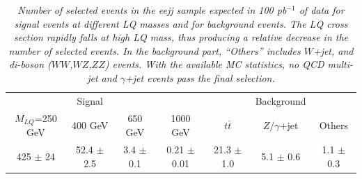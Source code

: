 


\begin{table}[htbp]
\begin{center}
\begin{tabular}{|cccc||ccc|}
\hline
                 &   Signal&         &          & & Background & \\
$M_{LQ}$=250 GeV & 400 GeV & 650 GeV & 1000 GeV & $t\bar{t}$  & $Z/\gamma$+jet & Others \\
\hline
425 $\pm$ 24 & 52.4 $\pm$ 2.5 & 3.4 $\pm$ 0.1 & 0.21 $\pm$ 0.01 & 21.3 $\pm$ 1.0 & 5.1 $\pm$ 0.6 & 1.1 $\pm$ 0.3 \\
\hline
\end{tabular}
\end{center}
\caption{\small \sl Number of selected events in the eejj sample expected in 100 pb$^{-1}$ of data for signal events at different LQ masses 
and for background events. 
The LQ cross section rapidly falls at high LQ mass, thus 
producing a relative decrease in the number of selected events. 
In the background part, ``Others'' includes $W$+jet, and 
di-boson ($WW$,$WZ$,$ZZ$) events. 
With the available MC statistics, no QCD multi-jet and $\gamma$+jet events pass the final selection.}
\label{tab:EventSelSummary}
\end{table}

